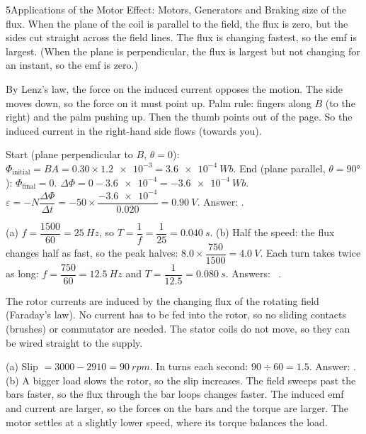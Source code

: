 \begin{chapteranswers}{5}{Applications of the Motor Effect: Motors, Generators and Braking}
        size of the flux. When the plane of the coil is parallel to the field, the
        flux is zero, but the sides cut straight across the field lines. The flux is
        changing fastest, so the emf is largest. (When the plane is perpendicular,
        the flux is largest but not changing for an instant, so the emf is zero.)
  \item By Lenz's law, the force on the induced current opposes the motion. The side
        moves down, so the force on it must point up. Palm rule: fingers along $B$ (to
        the right) and the palm pushing up. Then the thumb points out of the page. So
        the induced current in the right-hand side flows 
        (towards you).
  \item Start (plane perpendicular to $B$, $\theta = 0$):
        $\Phi_\mathrm{initial} = BA = 0.30 \times \num{1.2e-3} = \qty{3.6e-4}{Wb}$.
        End (plane parallel, $\theta = \ang{90}$): $\Phi_\mathrm{final} = 0$.
        $\Delta\Phi = 0 - \num{3.6e-4} = \qty{-3.6e-4}{Wb}$.
        $\varepsilon = -N\dfrac{\Delta\Phi}{\Delta t}
        = -50 \times \dfrac{\num{-3.6e-4}}{0.020} = \qty{0.90}{V}$.
        Answer: .
  \item (a) $f = \dfrac{1500}{60} = \qty{25}{Hz}$, so
        $T = \dfrac{1}{f} = \dfrac{1}{25} = \qty{0.040}{s}$.
        (b) Half the speed: the flux changes half as fast, so the peak halves:
        $8.0 \times \dfrac{750}{1500} = \qty{4.0}{V}$. Each turn takes twice as long:
        $f = \dfrac{750}{60} = \qty{12.5}{Hz}$ and $T = \dfrac{1}{12.5} = \qty{0.080}{s}$.
        Answers:  \ .
  \item The rotor currents are induced by the changing flux of the rotating field
        (Faraday's law). No current has to be fed into the rotor, so no sliding
        contacts (brushes) or commutator are needed. The stator coils do not move,
        so they can be wired straight to the supply.
  \item (a) Slip $= 3000 - 2910 = \qty{90}{rpm}$. In turns each second:
        $90 \div 60 = 1.5$. Answer: .
        (b) A bigger load slows the rotor, so the slip increases. The field sweeps past
        the bars faster, so the flux through the bar loops changes faster. The induced
        emf and current are larger, so the forces on the bars and the torque are larger.
        The motor settles at a slightly lower speed, where its torque balances the load.

\end{chapteranswers}
